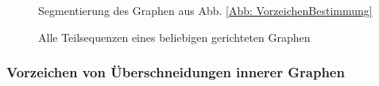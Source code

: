 \begin{figure}[h!]
    \begin{subfigure}[c]{0.3\textwidth}
    
    \end{subfigure}
    \hspace{0.2\textwidth}
    \begin{subfigure}[c]{0.3\textwidth}
    
    \end{subfigure}
    \caption{Segmentierung des Graphen aus Abb. \ref{Abb: VorzeichenBestimmung}}
    \label{Abb: Segmentierung}
\end{figure}

\begin{figure}[h!]
    \centering
    
    \caption{Alle Teilsequenzen eines beliebigen gerichteten Graphen }
    \label{Abb: directedElemets}
\end{figure}


\subsubsection{Vorzeichen von Überschneidungen innerer Graphen} 

